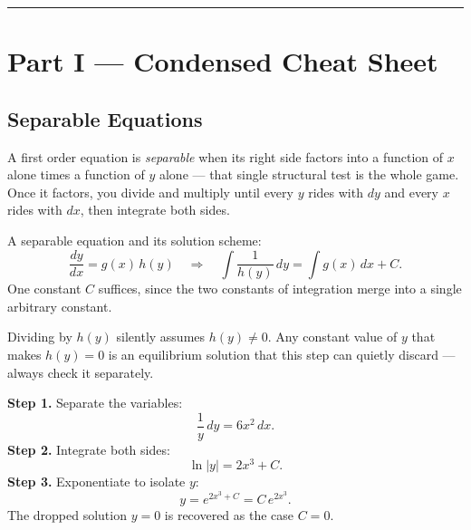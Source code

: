 \vspace{0.6em}
\hrule
\vspace{0.6em}

{}
\section*{Part I --- Condensed Cheat Sheet}
\setcounter{section}{2}   %

\subsection{Separable Equations}

A first order equation is \emph{separable} when its right side factors into a
function of $x$ alone times a function of $y$ alone --- that single structural
test is the whole game. Once it factors, you divide and multiply until every
$y$ rides with $dy$ and every $x$ rides with $dx$, then integrate both sides.

\begin{formulabox}
A separable equation and its solution scheme:
\[
    \frac{dy}{dx} = g(x)\,h(y)
    \quad\Longrightarrow\quad
    \int \frac{1}{h(y)}\,dy = \int g(x)\,dx + C.
\]
One constant $C$ suffices, since the two constants of integration merge into
a single arbitrary constant.
\end{formulabox}

\begin{warningbox}
Dividing by $h(y)$ silently assumes $h(y) \neq 0$. Any constant value of $y$ that
makes $h(y) = 0$ is an equilibrium solution that this step can quietly discard ---
always check it separately.
\end{warningbox}

\begin{examplebox}[Worked Example 2.1: Solve $\frac{dy}{dx} = 6x^{2}y$]
\textbf{Step 1.} Separate the variables:
\[ \frac{1}{y}\,dy = 6x^{2}\,dx. \]
\textbf{Step 2.} Integrate both sides:
\[ \ln|y| = 2x^{3} + C. \]
\textbf{Step 3.} Exponentiate to isolate $y$:
\[ y = e^{2x^{3} + C} = C\,e^{2x^{3}}. \]
The dropped solution $y = 0$ is recovered as the case $C = 0$.
\end{examplebox}

